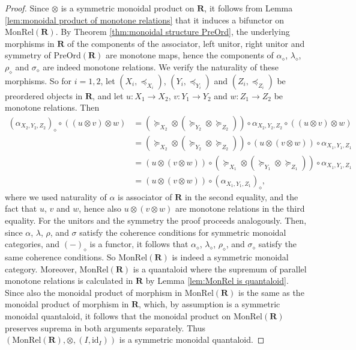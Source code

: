 \documentclass[12pt]{tac}
\theoremstyle{definition}
\theoremstyle{remark}
\newcommand{\qo}{{\boldsymbol{\preccurlyeq}}}
\newcommand{\qop}{{\boldsymbol{\succcurlyeq}}}
\newcommand{\<}{\langle}
\renewcommand{\>}{\rangle}
\renewcommand{\:}{\colon}
\newcommand{\id}{\mathrm{id}}
\begin{document}
\begin{proof}
 Since $\otimes$ is a symmetric monoidal product on $\mathbf{R}$, it follows from Lemma \ref{lem:monoidal product of monotone relations} that it induces a bifunctor on $\mathrm{MonRel}(\mathbf{R})$. By Theorem \ref{thm:monoidal structure PreOrd}, the underlying morphisms in $\mathbf R$ of the components of the associator, left unitor, right unitor and symmetry of $\mathrm{PreOrd}(\mathbf R)$ are monotone maps, hence the components of $\alpha_{\diamond}$, $\lambda_\diamond$, $\rho_\diamond$ and $\sigma_\diamond$ are indeed monotone relations. We verify the naturality of these morphisms. So for $i=1,2$, let $(X_i,\qo_{X_i})$, $(Y_i,\qo_{Y_i})$ and $(Z_i,\qo_{Z_i})$ be preordered objects in $\mathbf R$, and let $u:X_1\to X_2$, $v:Y_1\to Y_2$ and $w:Z_1\to Z_2$ be monotone relations. 
  Then
 \begin{align*}
     (\alpha_{X_2,Y_2,Z_2})_\diamond\circ ((u\otimes v)\otimes w) &=(\qop_{X_2}\otimes (\qop_{Y_2}\otimes \qop_{Z_2}))\circ\alpha_{X_2,Y_2,Z_2}\circ ((u\otimes v)\otimes w) \\
     & = (\qop_{X_2}\otimes (\qop_{Y_2}\otimes \qop_{Z_2}))\circ  (u\otimes (v\otimes w))\circ\alpha_{X_1,Y_1,Z_1}\\
     & = (u\otimes (v\otimes w))\circ (\qop_{X_1}\otimes (\qop_{Y_1}\otimes \qop_{Z_1}))\circ\alpha_{X_1,Y_1,Z_1}\\
     & = (u\otimes (v\otimes w))\circ  (\alpha_{X_1,Y_1,Z_1})_\diamond,
 \end{align*}
 where we used naturality of $\alpha$ is associator of $\mathbf R$ in the second equality, and the fact that $u$, $v$ and $w$, hence also $u\otimes(v\otimes w)$ are monotone relations in the third equality. For the unitors and the symmetry the proof proceeds analogously. Then, since $\alpha$, $\lambda$, $\rho$, and $\sigma$ satisfy the coherence conditions for symmetric monoidal categories, and $(-)_\diamond$ is a functor, it follows that $\alpha_\diamond$, $\lambda_\diamond$, $\rho_\diamond$, and $\sigma_\diamond$ satisfy the same coherence conditions. So $\mathrm{MonRel}(\mathbf R)$ is indeed a symmetric monoidal category. Moreover, $\mathrm{MonRel}(\mathbf R)$ is a quantaloid where the supremum of parallel monotone relations is calculated in $\mathbf R$ by Lemma \ref{lem:MonRel is quantaloid}. Since also the monoidal product of morphism in $\mathrm{MonRel}(\mathbf R)$ is the same as the monoidal product of morphism in $\mathbf R$, which, by assumption is a symmetric monoidal quantaloid, it follows that the monoidal product on $\mathrm{MonRel}(\mathbf R)$ preserves suprema in both arguments separately. Thus  $(\mathrm{MonRel}(\mathbf{R}),\otimes,(I,\id_I))$ is a symmetric monoidal quantaloid.
\end{proof}
\end{document}
